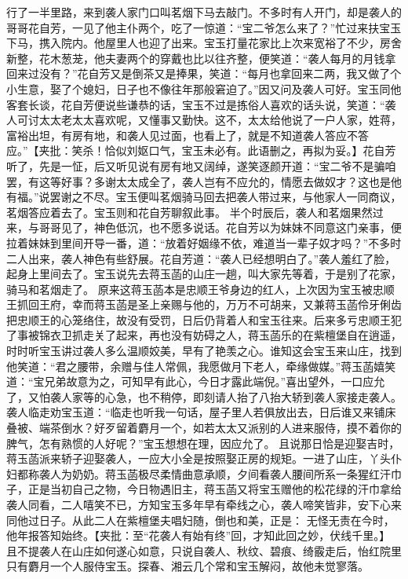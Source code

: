 \documentclass[12pt,oneside]{book}
\begin{document}
行了一半里路，来到袭人家门口叫茗烟下马去敲门。不多时有人开门，却是袭人的哥哥花自芳，一见了他主仆两个，吃了一惊道：“宝二爷怎么来了？”忙过来扶宝玉下马，携入院内。他屋里人也迎了出来。宝玉打量花家比上次来宽裕了不少，房舍新整，花木葱茏，他夫妻两个的穿戴也比以往齐整，便笑道：“袭人每月的月钱拿回来过没有？”花自芳又是倒茶又是捧果，笑道：“每月也拿回来二两，我又做了个小生意，娶了个媳妇，日子也不像往年那般窘迫了。”因又问及袭人可好。宝玉同他客套长谈，花自芳便说些谦恭的话，宝玉不过是拣俗人喜欢的话头说，笑道：“袭人可讨太太老太太喜欢呢，又懂事又勤快。这不，太太给他说了一户人家，姓蒋，富裕出坦，有房有地，和袭人见过面，也看上了，就是不知道袭人答应不答应。”【夹批：笑杀！恰似刘妪口气，宝玉未必有。此语删之，再拟为妥。】花自芳听了，先是一怔，后又听见说有房有地又阔绰，遂笑逐颜开道：“宝二爷不是骗咱罢，有这等好事？多谢太太成全了，袭人岂有不应允的，情愿去做奴才？这也是他有福。”说罢谢之不尽。宝玉便叫茗烟骑马回去把袭人带过来，与他家人一同商议，茗烟答应着去了。宝玉则和花自芳聊叙此事。
半个时辰后，袭人和茗烟果然过来，与哥哥见了，神色低沉，也不愿多说话。花自芳以为妹妹不同意这门亲事，便拉着妹妹到里间开导一番，道：“放着好姻缘不依，难道当一辈子奴才吗？”不多时二人出来，袭人神色有些舒展。花自芳道：“袭人已经想明白了。”袭人羞红了脸，起身上里间去了。宝玉说先去蒋玉菡的山庄一趟，叫大家先等着，于是别了花家，骑马和茗烟走了。
原来这蒋玉菡本是忠顺王爷身边的红人，上次因为宝玉被忠顺王抓回王府，幸而蒋玉菡是圣上亲赐与他的，万万不可胡来，又兼蒋玉菡伶牙俐齿把忠顺王的心笼络住，故没有受罚，日后仍背着人和宝玉往来。后来多亏忠顺王犯了事被锦衣卫抓走关了起来，再也没有妨碍之人，蒋玉菡乐的在紫檀堡自在逍遥，时时听宝玉讲过袭人多么温顺姣美，早有了艳羡之心。谁知这会宝玉来山庄，找到他笑道：“君之腰带，余赠与佳人常佩，我愿做月下老人，牵缘做媒。”蒋玉菡嬉笑道：“宝兄弟故意为之，可知早有此心，今日才露此端倪。”喜出望外，一口应允了，又怕袭人家等的心急，也不稍停，即刻请人抬了八抬大轿到袭人家接走袭人。袭人临走劝宝玉道：“临走也听我一句话，屋子里人若俱放出去，日后谁又来铺床叠被、端茶倒水？好歹留着麝月一个，如若太太又派别的人进来服侍，摸不着你的脾气，怎有熟惯的人好呢？”宝玉想想在理，因应允了。
且说那日恰是迎娶吉时，蒋玉菡派来轿子迎娶袭人，一应大小全是按照娶正房的规矩。一进了山庄，丫头仆妇都称袭人为奶奶。蒋玉菡极尽柔情曲意承顺，夕间看袭人腰间所系一条猩红汗巾子，正是当初自己之物，今日物遇旧主，蒋玉菡又将宝玉赠他的松花绿的汗巾拿给袭人同看，二人嘻笑不已，方知宝玉多年早有牵线之心，袭人啼笑皆非，安下心来同他过日子。从此二人在紫檀堡夫唱妇随，倒也和美，正是：
无怪无责在今时，他年报答知始终。【夹批：至“花袭人有始有终”回，才知此回之妙，伏线千里。】
且不提袭人在山庄如何遂心如意，只说自袭人、秋纹、碧痕、绮霰走后，怡红院里只有麝月一个人服侍宝玉。探春、湘云几个常和宝玉解闷，故他未觉寥落。
\end{document}
